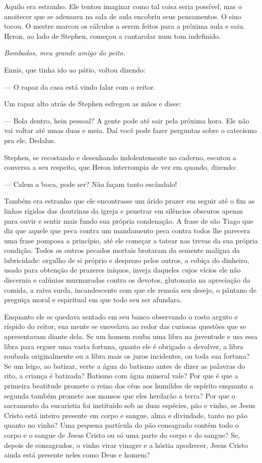 Aquilo era estranho. Ele tentou imaginar como tal coisa seria possível,
mas o anoitecer que se adensava na sala de aula encobriu seus
pensamentos. O sino tocou. O mestre marcou os cálculos a serem feitos
para a próxima aula e saiu. Heron, ao lado de Stephen, começou a
cantarolar num tom indefinido.

\textit{Bombados, meu grande amigo do peito.}

Ennis, que tinha ido ao pátio, voltou dizendo:

 --- O rapaz da casa está vindo falar com o reitor.

Um rapaz alto atrás de Stephen esfregou as mãos e disse:

 --- Bola dentro, hein pessoal? A gente pode até sair pela próxima hora.
Ele não vai voltar até umas duas e meia. Daí você pode fazer perguntas
sobre o catecismo pra ele, Dedalus.

Stephen, se recostando e desenhando indolentemente no caderno, escutou
a conversa a seu respeito, que Heron interrompia de vez em quando,
dizendo:

--- Calem a boca, pode ser? Não façam tanto escândalo!

Também era estranho que ele encontrasse um árido prazer em seguir até o
fim as linhas rígidas das doutrinas da igreja e penetrar em silêncios
obscuros apenas para ouvir e sentir mais fundo sua própria condenação.
A frase de são Tiago que diz que aquele que peca contra um mandamento
peca contra todos lhe parecera uma frase pomposa a princípio, até ele
começar a tatear nas trevas da sua própria condição. Todos os outros
pecados mortais brotaram da semente maligna da lubricidade: orgulho de
si próprio e desprezo pelos outros, a cobiça do dinheiro, usado para
obtenção de prazeres iníquos, inveja daqueles cujos vícios ele não
discernia e calúnias murmuradas contra os devotos, glutonaria na
apreciação da comida, a raiva surda, incandescente com que ele remoía
seu desejo, o pântano de preguiça moral e espiritual em que todo seu
ser afundara.

Enquanto ele se quedava sentado em seu banco observando o rosto arguto e
ríspido do reitor, sua mente se enovelava ao redor das curiosas
questões que se apresentavam diante dela. Se um homem rouba uma libra
na juventude e usa essa libra para erguer uma vasta fortuna, quanto ele
é obrigado a devolver, a libra roubada originalmente ou a libra mais os
juros incidentes, ou toda sua fortuna? Se um leigo, ao batizar, verte a
água do batismo antes de dizer as palavras do rito, a criança é
batizada? Batismo com água mineral vale? Por que é que a primeira
beatitude promete o reino dos céus aos humildes de espírito enquanto a
segunda também promete aos mansos que eles herdarão a terra? Por que o
sacramento da eucaristia foi instituído sob as duas espécies, pão e
vinho, se Jesus Cristo está inteiro presente em corpo e sangue, alma e
divindade, tanto no pão quanto no vinho? Uma pequena partícula do pão
consagrado contém todo o corpo e o sangue de Jesus Cristo ou só uma
parte do corpo e do sangue? Se, depois de consagrados, o vinho virar
vinagre e a hóstia apodrecer, Jesus Cristo ainda está presente neles
como Deus e homem?


